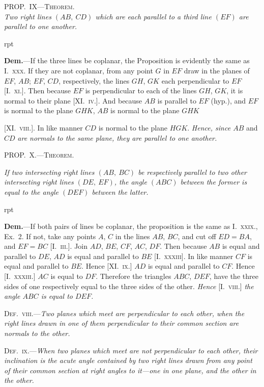 \documentclass[oneside]{book}
\newcounter{wrapwidth}
\newcommand\myprop[2]{
\bigskip\Needspace*{4\baselineskip}\begin{center}\textsc{#1}\\\medskip\emph{#2}\par\end{center}
}
\newcommand\mypropl[2]{
\bigskip\Needspace*{4\baselineskip}\begin{center}\textsc{#1}\end{center}
\hspace{\parindent}\emph{#2}\par\medskip
}
\newcommand\imgflow[3]{
\setcounter{wrapwidth}{#1}

\begin{wrapfigure}[#2]{r}{\value{wrapwidth}pt}
\begin{center}
\vspace{-0.3in}

\end{center}
\end{wrapfigure}
}
\begin{document}
\myprop{PROP\@.~IX---Theorem.}{Two right lines $(AB,\ CD)$ which are each parallel to a
third line $(EF)$ are parallel to one another.}


\imgflow{133}{7}{f223}

\textbf{Dem.}---If the three lines be coplanar, the Proposition
is evidently the same
as I.~\textsc{xxx}. If they are not
coplanar, from any point $G$
in $EF$ draw in the planes of
$EF$, $AB$; $EF$, $CD$, respectively,
the lines $GH$, $GK$ each
perpendicular\label{perpendiclar}
to $EF$ [I.~\textsc{xi.}].
Then because $EF$ is perpendicular to each of the lines
$GH$, $GK$, it is normal to their plane [XI\@.~\textsc{iv.}]. And
because $AB$ is parallel to $EF$ (hyp.), and $EF$ is normal
to the plane $GHK$, $AB$ is normal to the plane $GHK$

[XI\@.~\textsc{viii.}]. In like manner $CD$ is normal to the plane
$HGK$. \emph{Hence, since $AB$} and $CD$ \emph{are normals to the same
plane, they are parallel to one another.}

\mypropl{PROP\@.~X.---Theorem.}{If two intersecting right lines $(AB,\ BC)$ be respectively
parallel to two other intersecting right lines $(DE,\ EF)$,
the angle $(ABC)$ between the former is equal to the angle
$(DEF)$ between the latter.}


\imgflow{120}{10}{f224}

\textbf{Dem.}---If both pairs of lines be coplanar, the proposition
is the same as I.~\textsc{xxix.},
Ex.~2. If not, take any points
$A$, $C$ in the lines $AB$, $BC$, and
cut off $ED = BA$, and $EF = BC$
[I.~\textsc{iii.}]. Join $AD$, $BE$, $CF$,
$AC$, $DF$. Then because $AB$ is
equal and parallel to $DE$, $AD$
is equal and parallel to $BE$
[I.~\textsc{xxxiii}]. In like manner
$CF$ is equal and parallel to $BE$.
Hence [XI\@.~\textsc{ix.}] $AD$ is equal
and parallel to $CF$. Hence [I.~\textsc{xxxiii.}] $AC$ is equal to
$DF$. Therefore the triangles $ABC$, $DEF$, have the
three sides of one respectively equal to the three sides
of the other. \emph{Hence} [I.~\textsc{viii.}] \emph{the angle $ABC$ is equal
to $DEF$.}

\textsc{Def.~viii.}---\emph{Two planes which meet are perpendicular
to each other, when the right lines drawn in one of them
perpendicular to their common section are normals to the
other.}

\textsc{Def.~ix.}---\emph{When two planes which meet are not perpendicular
to each other, their inclination is the acute angle
contained by two right lines drawn from any point of their
common section at right angles to it---one in one plane, and
the other in the other.}
\end{document}
